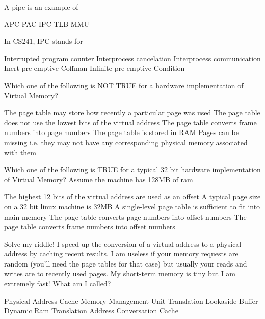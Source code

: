\variant
A pipe is an example of
\begin{answers}
\answer APC
\answer PAC
\correctanswer IPC
\answer TLB
\answer MMU
\end{answers}
\begin{solution}
\end{solution}


\variant
In CS241, IPC stands for 
\begin{answers}
\answer Interrupted program counter
\answer Interprocess cancelation
\correctanswer Interprocess communication
\answer Inert pre-emptive Coffman 
\answer Infinite pre-emptive Condition
\end{answers}
\begin{solution}
\end{solution}


\variant
Which one of the following is NOT TRUE for a hardware implementation of Virtual Memory?
\begin{answers}
\answer The page table may store how recently a particular page was used
\answer The page table does not use the lowest bits of the virtual address
\correctanswer The page table converts frame numbers into page numbers
\answer The page table is stored in RAM
\answer Pages can be missing i.e. they may not have any corresponding physical memory associated with them
\end{answers}
\begin{solution}
\end{solution}


\variant
Which one of the following is TRUE for a typical 32 bit hardware implementation of Virtual Memory? Assume the machine has 128MB of ram
\begin{answers}
\answer The highest 12 bits of the virtual address are used as an offset
\answer A typical page size on a 32 bit linux machine is 32MB 
\correctanswer A single-level page table is sufficient to fit into main memory
\answer The page table converts page numbers into offset numbers
\answer The page table converts frame numbers into offset numbers
\end{answers}
\begin{solution}
\end{solution}



\variant
Solve my riddle! I speed up the conversion of a virtual address to a physical address by caching recent results. I am useless if your memory requests are random (you'll need the page tables for that case) but usually your reads and writes are to recently used pages. My short-term memory is tiny but I am extremely fast! What am I called?
\begin{answers}
\answer Physical Address Cache
\answer Memory Management Unit
\correctanswer Translation Lookaside Buffer
\answer Dynamic Ram Translation
\answer Address Conversation Cache
\end{answers}
\begin{solution}
\end{solution}

